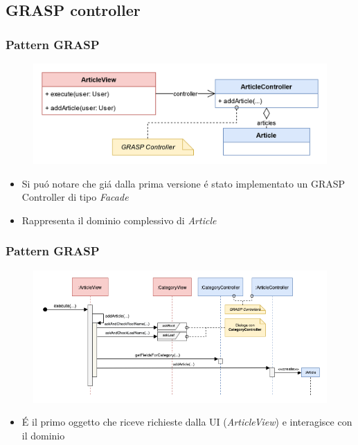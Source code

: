 \subsection{GRASP controller}
\begin{frame}
    \frametitle{Pattern GRASP}
    \begin{figure}
        \includegraphics[width=1\textwidth]{img/MV.png}
    \end{figure}
    \begin{itemize}
        \item Si puó notare che giá dalla prima versione é stato implementato un GRASP Controller di tipo \emph{Facade}
        \item Rappresenta il dominio complessivo di \emph{Article}
    \end{itemize}
\end{frame}

\begin{frame}
    \frametitle{Pattern GRASP}
    \begin{figure}
        \includegraphics[width=1\textwidth]{img/sequenzaGraspController.png}
    \end{figure}
    \begin{itemize}
        \item É il primo oggetto che riceve richieste dalla UI (\emph{ArticleView}) e interagisce con il dominio
    \end{itemize}
\end{frame}




